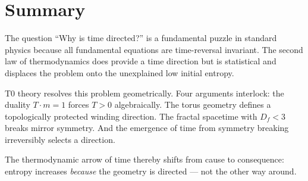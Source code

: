 \begin{table}[htbp]
	\centering
	\caption{Comparison of different explanations of the arrow of time}
\end{table}

\section{Summary}

The question ``Why is time directed?'' is a fundamental puzzle in standard physics because all fundamental equations are time-reversal invariant. The second law of thermodynamics does provide a time direction but is statistical and displaces the problem onto the unexplained low initial entropy.

T0 theory resolves this problem geometrically. Four arguments interlock: the duality $T \cdot m = 1$ forces $T > 0$ algebraically. The torus geometry defines a topologically protected winding direction. The fractal spacetime with $D_f < 3$ breaks mirror symmetry. And the emergence of time from symmetry breaking irreversibly selects a direction.

The thermodynamic arrow of time thereby shifts from cause to consequence: entropy increases \emph{because} the geometry is directed --- not the other way around.

